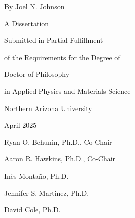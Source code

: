 \begin{centering}
\begin{large}
\begin{spacing}{1.8}

\vspace*{\baselineskip}

\dissertationTitle{}

\thispagestyle{empty} %

\vspace{\baselineskip}

By Joel N. Johnson


A Dissertation

Submitted in Partial Fulfillment

of the Requirements for the Degree of


Doctor of Philosophy

in Applied Physics and Materials Science

\vspace{\baselineskip}

Northern Arizona University

April 2025

\vspace{2\baselineskip}


Ryan O. Behunin, Ph.D., Co-Chair

Aaron R. Hawkins, Ph.D., Co-Chair

Inès Montaño, Ph.D.

Jennifer S. Martinez, Ph.D.

David Cole, Ph.D.

\end{spacing}
\end{large}
\end{centering}
